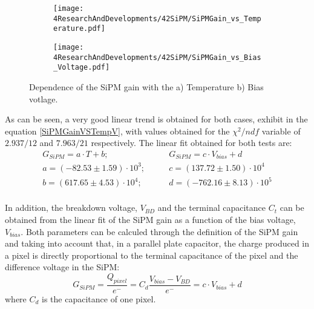 \begin{figure}
\centering
    \begin{subfigure}[b]{0.47\textwidth}
    \centering
    \texttt{[image: 4ResearchAndDevelopments/42SiPM/SiPMGain\_vs\_Temperature.pdf]}  
    \caption{\label{subfig:SiPMGainvsTemperature}}
    \end{subfigure}
    \hfill
    \begin{subfigure}[b]{0.47\textwidth}
    \centering
    \texttt{[image: 4ResearchAndDevelopments/42SiPM/SiPMGain\_vs\_Bias\_Voltage.pdf]}  
    \caption{\label{subfig:SiPMGainvsBiasVoltage}}
    \end{subfigure}
 \caption{Dependence of the SiPM gain with the a) Temperature b) Bias votlage.}
 \label{fig:SiPMGainDependance}
\end{figure}

As can be seen, a very good linear trend is obtained for both cases, exhibit in the equation \ref{SiPMGainVSTempV}, with values obtained for the $\chi^2/ndf$ variable of $2.937/12$ and $7.963/21$ respectively. The linear fit obtained for both tests are:
\begin{equation*}
\begin{split}
G_{SiPM}=a \cdot{} T + b;& \qquad G_{SiPM}=c \cdot{} V_{bias} + d\\
a=\left( -82.53 \pm 1.59 \right) \cdot{} 10^{3};& \qquad c=\left( 137.72 \pm 1.50 \right) \cdot{} 10^{4}\\
b=\left( 617.65 \pm 4.53 \right) \cdot{} 10^{4};& \qquad d=\left( -762.16 \pm 8.13 \right) \cdot{} 10^{5} \\
\label{SiPMGainVSTempV}
\end{split}
\end{equation*} 

In addition, the breakdown voltage, $V_{BD}$ and the terminal capacitance $C_t$ can be obtained from the linear fit of the SiPM gain as a function of the bias voltage, $V_{bias}$. Both parameters can be calculed through the definition of the SiPM gain and taking into account that, in a parallel plate capacitor, the charge produced in a pixel is directly proportional to the terminal capacitance of the pixel and the difference voltage in the SiPM:
\begin{equation}
G_{SiPM}=\frac{Q_{pixel}}{e^-} = C_d \frac{V_{bias}-V_{BD}}{e^-} = c \cdot{} V_{bias}+d
\label{SiPMGain_Capacitance}
\end{equation}
where $C_d$ is the capacitance of one pixel.


